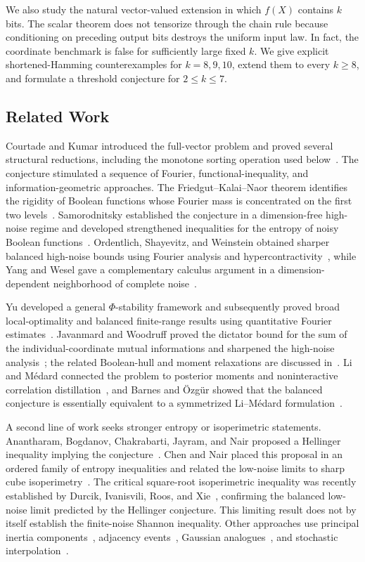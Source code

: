We also study the natural vector-valued extension in which \(f(X)\)
contains \(k\) bits. The scalar theorem does not tensorize through the
chain rule because conditioning on preceding output bits destroys the
uniform input law. In fact, the coordinate benchmark is false for
sufficiently large fixed \(k\). We give explicit shortened-Hamming
counterexamples for \(k=8,9,10\), extend them to every \(k\geq8\), and
formulate a threshold conjecture for \(2\leq k\leq7\).

\subsection{Related Work}

Courtade and Kumar introduced the full-vector problem and proved several
structural reductions, including the monotone sorting operation used
below~\cite{CK}. The conjecture stimulated a sequence of Fourier,
functional-inequality, and information-geometric approaches. The
Friedgut--Kalai--Naor theorem identifies the rigidity of Boolean functions
whose Fourier mass is concentrated on the first two levels~\cite{FKN}.
Samorodnitsky established the conjecture in a dimension-free high-noise
regime and developed strengthened inequalities for the entropy of noisy
Boolean functions~\cite{Sam,SamEntropy}. Ordentlich, Shayevitz, and
Weinstein obtained sharper balanced high-noise bounds using Fourier
analysis and hypercontractivity~\cite{OSW}, while Yang and Wesel gave a
complementary calculus argument in a dimension-dependent neighborhood of
complete noise~\cite{YW}.

Yu developed a general \(\Phi\)-stability framework and subsequently
proved broad local-optimality and balanced finite-range results using
quantitative Fourier estimates~\cite{YuPhi,Yu,YuSharp}. Javanmard and
Woodruff proved the dictator bound for the sum of the individual-coordinate
mutual informations and sharpened the high-noise analysis~\cite{JW}; the
related Boolean-hull and moment relaxations are discussed in~\cite{Gemini}.
Li and M\'edard connected the problem to posterior moments and
noninteractive correlation distillation~\cite{LM}, and Barnes and
\"Ozg\"ur showed that the balanced conjecture is essentially equivalent
to a symmetrized Li--M\'edard formulation~\cite{BO}.

A second line of work seeks stronger entropy or isoperimetric statements.
Anantharam, Bogdanov, Chakrabarti, Jayram, and Nair proposed a Hellinger
inequality implying the conjecture~\cite{Hellinger}. Chen and Nair placed
this proposal in an ordered family of entropy inequalities and related
the low-noise limits to sharp cube isoperimetry~\cite{CN}. The critical
square-root isoperimetric inequality was recently established by Durcik,
Ivanisvili, Roos, and Xie~\cite{DIRX}, confirming the balanced low-noise
limit predicted by the Hellinger conjecture. This limiting result does
not by itself establish the finite-noise Shannon inequality. Other approaches use principal inertia components~\cite{PIC}, adjacency
events~\cite{HOS}, Gaussian analogues~\cite{KOW}, and stochastic
interpolation~\cite{EMR}.

